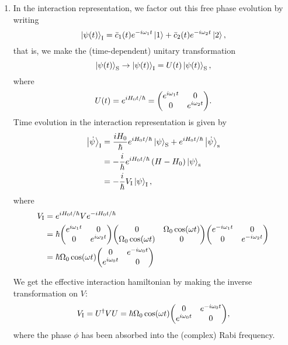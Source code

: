 \documentclass[12pt]{article}
\begin{document}
\begin{enumerate}[label=(\alph*)]
    \item In the interaction representation, we factor out this free phase evolution by writing
    \[ \ket{\psi(t)}_\text{I} = \bar{c}_1(t)e^{-i\omega_1t}\ket{1} + \bar{c}_2(t)e^{-i\omega_2t}\ket{2}, \]
    that is, we make the (time-dependent) unitary transformation
    \[ \ket{\psi(t)}_\text{S} \to \ket{\psi(t)}_\text{I} = U(t)\ket{\psi(t)}_\text{S}, \]
    where
    \[ U(t) = e^{iH_0t/\hbar} =  \mqty(e^{i\omega_1t}&0\\0&e^{i\omega_2t}). \] 
    Time evolution in the interaction representation is given by
    \begin{align*}
        \ket{\dot{\psi}}_\text{I} &= \frac{iH_0}{\hbar}e^{iH_0t/\hbar}\ket{\psi}_\text{S} + e^{iH_0t/\hbar}\ket{\dot{\psi}}_\text{s} \\
        &= -\frac{i}{\hbar}e^{iH_0t/\hbar}\left(H - H_0\right)\ket{\psi}_\text{s} \\
        &= -\frac{i}{\hbar}V_\text{I}\ket{\psi}_\text{I},
    \end{align*}
    where
    \begin{align*}
        V_\text{I} &= e^{iH_0t/\hbar}Ve^{-iH_0t/\hbar} \\
        &= \hbar\mqty(e^{i\omega_1t}&0\\0&e^{i\omega_2t})\mqty(0&\Omega_0\cos(\omega t)\\\Omega_0\cos(\omega t)&0)\mqty(e^{-i\omega_1t}&0\\0&e^{-i\omega_2t}) \\
        &= \hbar\Omega_0 \cos(\omega t) \mqty(0&e^{-i\omega_0t}\\e^{i\omega_0t}&0)
    \end{align*}
    
    We get the effective interaction hamiltonian by making the inverse transformation on $V$:
    \[ V_\text{I} = U^\dag VU = \hbar\Omega_0 \cos(\omega t) \mqty(0&e^{-i\omega_0t}\\e^{i\omega_0t}&0), \]
    where the phase $\phi$ has been absorbed into the (complex) Rabi frequency.


\end{enumerate}
\end{document}
